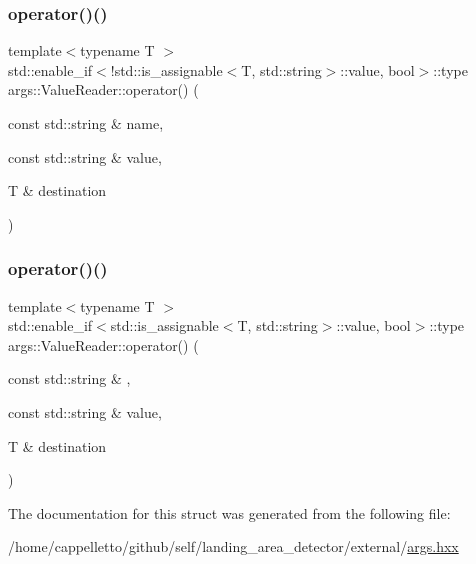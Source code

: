 \subsubsection{\texorpdfstring{operator()()}{operator()()}\hspace{0.1cm}{\footnotesize\ttfamily [1/2]}}
{\footnotesize\ttfamily template$<$typename T $>$ \\
std\+::enable\+\_\+if$<$!std\+::is\+\_\+assignable$<$T, std\+::string$>$\+::value, bool$>$\+::type args\+::\+Value\+Reader\+::operator() (\begin{DoxyParamCaption}\item[{const std\+::string \&}]{name,  }\item[{const std\+::string \&}]{value,  }\item[{T \&}]{destination }\end{DoxyParamCaption})\hspace{0.3cm}{\ttfamily [inline]}}

\mbox{\label{structargs_1_1_value_reader_a6435ca3f4539456710e990ed5b96d0d1}} 
\subsubsection{\texorpdfstring{operator()()}{operator()()}\hspace{0.1cm}{\footnotesize\ttfamily [2/2]}}
{\footnotesize\ttfamily template$<$typename T $>$ \\
std\+::enable\+\_\+if$<$std\+::is\+\_\+assignable$<$T, std\+::string$>$\+::value, bool$>$\+::type args\+::\+Value\+Reader\+::operator() (\begin{DoxyParamCaption}\item[{const std\+::string \&}]{,  }\item[{const std\+::string \&}]{value,  }\item[{T \&}]{destination }\end{DoxyParamCaption})\hspace{0.3cm}{\ttfamily [inline]}}



The documentation for this struct was generated from the following file\+:\begin{DoxyCompactItemize}
\item 
/home/cappelletto/github/self/landing\+\_\+area\+\_\+detector/external/\hyperlink{args_8hxx}{args.\+hxx}\end{DoxyCompactItemize}
